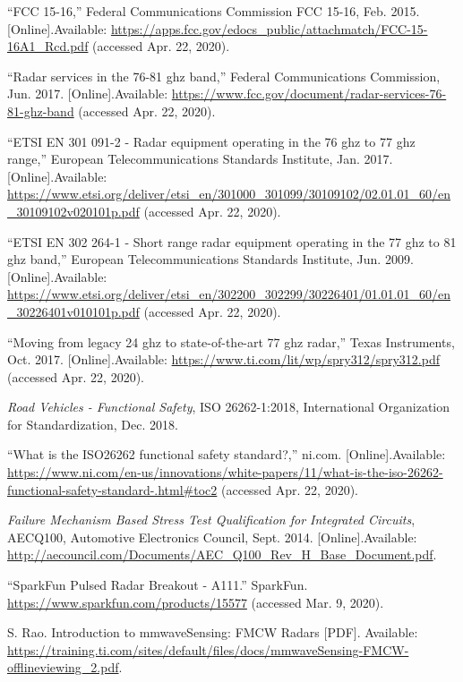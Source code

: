 \documentclass[11pt]{IEEEtran}
\begin{document}
\begin{thebibliography}{00}
			 ``FCC 15-16,'' Federal Communications Commission FCC 15-16, Feb. 2015. [Online].Available: \url{https://apps.fcc.gov/edocs_public/attachmatch/FCC-15-16A1_Rcd.pdf} (accessed Apr. 22, 2020).

			 ``Radar services in the 76-81 ghz band,'' Federal Communications Commission, Jun. 2017. [Online].Available: \url{https://www.fcc.gov/document/radar-services-76-81-ghz-band} (accessed Apr. 22, 2020).

			 ``ETSI EN 301 091-2 - Radar equipment operating in the 76 ghz to 77 ghz range,'' European Telecommunications Standards Institute, Jan. 2017. [Online].Available: \url{https://www.etsi.org/deliver/etsi_en/301000_301099/30109102/02.01.01_60/en_30109102v020101p.pdf} (accessed Apr. 22, 2020).

			 ``ETSI EN 302 264-1 - Short range radar equipment operating in the 77 ghz to 81 ghz band,'' European Telecommunications Standards Institute, Jun. 2009. [Online].Available: \url{https://www.etsi.org/deliver/etsi_en/302200_302299/30226401/01.01.01_60/en_30226401v010101p.pdf} (accessed Apr. 22, 2020).

			 ``Moving from legacy 24 ghz to state-of-the-art 77 ghz radar,'' Texas Instruments, Oct. 2017. [Online].Available: \url{https://www.ti.com/lit/wp/spry312/spry312.pdf} (accessed Apr. 22, 2020).

			 \textit{Road Vehicles - Functional Safety}, ISO 26262-1:2018, International Organization for Standardization, Dec. 2018.

			 ``What is the ISO26262 functional safety standard?,'' ni.com. [Online].Available: \url{https://www.ni.com/en-us/innovations/white-papers/11/what-is-the-iso-26262-functional-safety-standard-.html#toc2} (accessed Apr. 22, 2020).

	    	 \textit{Failure Mechanism Based Stress Test Qualification for Integrated Circuits}, AECQ100, Automotive Electronics Council, Sept. 2014. [Online].Available: \url{http://aecouncil.com/Documents/AEC_Q100_Rev_H_Base_Document.pdf}.


				 ``SparkFun Pulsed Radar Breakout - A111.'' SparkFun. \url{https://www.sparkfun.com/products/15577} (accessed Mar. 9, 2020).

			
				 S. Rao. Introduction to mmwaveSensing: FMCW Radars [PDF]. Available: \url{https://training.ti.com/sites/default/files/docs/mmwaveSensing-FMCW-offlineviewing_2.pdf}.



\end{thebibliography}
\end{document}
